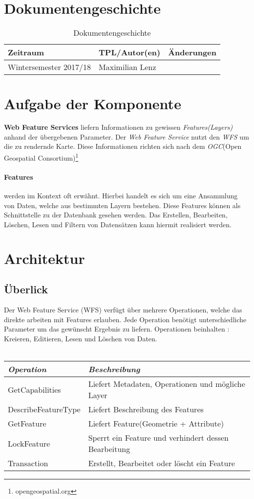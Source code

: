 
\section{Dokumentengeschichte}
\begin{table}[h]
 \begin{tabular}{|l|l|l|}
 \hline
 Zeitraum & TPL/Autor(en) & Änderungen \\
 \hline
 Wintersemester 2017/18 & Maximilian Lenz & 
  \\
 \hline
 \end{tabular}
 \caption{Dokumentengeschichte}
 \end{table}

\section{Aufgabe der Komponente}
\textbf{Web Feature Services} liefern Informationen zu gewissen \emph{Features(Layers)} anhand der \"ubergebenen Parameter. Der \emph{Web Feature Service} nutzt den \emph{WFS} um die zu rendernde Karte. Diese Informationen richten sich nach dem \emph{OGC}(Open Geospatial Consortium)\footnote{opengeospatial.org}

\paragraph*{Features} werden im Kontext oft erwähnt. Hierbei handelt es sich um eine Ansammlung von Daten, welche aus bestimmten Layern bestehen. Diese Features können als Schnittstelle zu der Datenbank gesehen werden. Das Erstellen, Bearbeiten, Löschen, Lesen und Filtern von Datensätzen kann hiermit realisiert werden.
 

\section{Architektur}
\subsection{\"Uberlick}
Der Web Feature Service (WFS) verfügt über mehrere Operationen, welche das direkte arbeiten mit Features erlauben. Jede Operation benötigt unterschiedliche Parameter um das gewünscht Ergebnis zu liefern. Operationen beinhalten : Kreieren, Editieren, Lesen und Löschen von Daten.\\
\vspace{1em}\\
\begin{tabular}{ll}
\emph{Operation} & \emph{Beschreibung} \\
\hline 
GetCapabilities & Liefert Metadaten, Operationen und m\"ogliche Layer \\ 
\hline 
DescribeFeatureType & Liefert Beschreibung des Features \\ 
\hline 
GetFeature & Liefert Feature(Geometrie + Attribute)\\ 
\hline 
LockFeature & Sperrt ein Feature und verhindert dessen Bearbeitung\\
\hline 
Transaction & Erstellt, Bearbeitet oder löscht ein Feature\\ 
\hline 
\end{tabular} 
